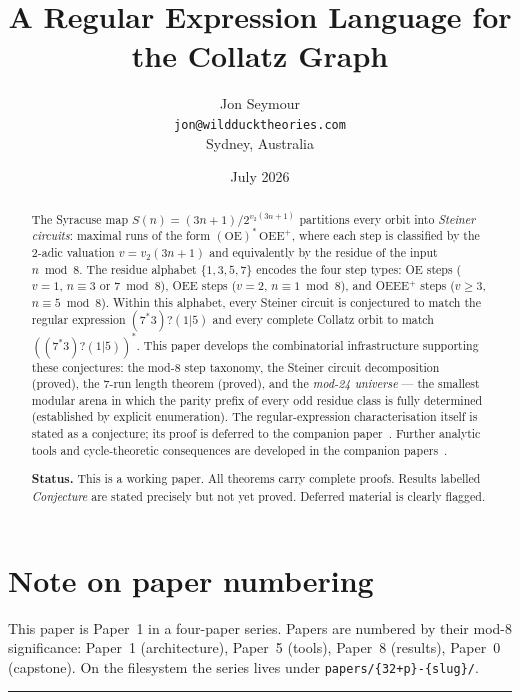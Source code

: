 \documentclass[11pt,a4paper]{article}
\title{A Regular Expression Language for the Collatz Graph}
\author{Jon Seymour\\
  \texttt{jon@wildducktheories.com}\\
  Sydney, Australia}
\date{July 2026}
\theoremstyle{remark}
\theoremstyle{plain}
\begin{document}
\maketitle

\begin{abstract}
The Syracuse map $S(n) = (3n+1)/2^{v_2(3n+1)}$ partitions every orbit into
\emph{Steiner circuits}: maximal runs of the form $(\text{OE})^*\,\text{OEE}^+$,
where each step is classified by the 2-adic valuation $v = v_2(3n+1)$ and
equivalently by the residue of the input $n \bmod 8$.
The residue alphabet $\{1, 3, 5, 7\}$ encodes the four step types:
OE steps ($v = 1$, $n \equiv 3$ or $7 \bmod 8$),
OEE steps ($v = 2$, $n \equiv 1 \bmod 8$), and
OEEE$^+$ steps ($v \geq 3$, $n \equiv 5 \bmod 8$).
Within this alphabet, every Steiner circuit is conjectured to match the regular
expression $(7^*3)?(1|5)$ and every complete Collatz orbit to match $((7^*3)?(1|5))^*$.
This paper develops the combinatorial infrastructure supporting these conjectures:
the mod-8 step taxonomy, the Steiner circuit decomposition (proved), the 7-run
length theorem (proved), and the \emph{mod-24 universe} --- the smallest modular
arena in which the parity prefix of every odd residue class is fully determined
(established by explicit enumeration).
The regular-expression characterisation itself is stated as a conjecture; its proof
is deferred to the companion paper~\cite{paper5}.
Further analytic tools and cycle-theoretic consequences are developed
in the companion papers~\cite{paper5,paper8}.

\medskip
\noindent\textbf{Status.}
This is a working paper.
All theorems carry complete proofs.
Results labelled \emph{Conjecture} are stated precisely but not yet proved.
Deferred material is clearly flagged.
\end{abstract}

\tableofcontents

\section*{Note on paper numbering}

This paper is Paper~1 in a four-paper series.
Papers are numbered by their mod-8 significance:
Paper~1 (architecture), Paper~5 (tools), Paper~8 (results), Paper~0 (capstone).
On the filesystem the series lives under \texttt{papers/\{32+p\}-\{slug\}/}.

\bigskip\hrule\bigskip

\end{document}
